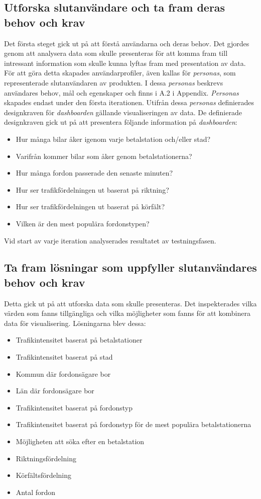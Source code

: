 \documentclass[12pt]{kththesis}
\begin{document}
\subsection{Utforska slutanvändare och ta fram deras behov och krav}
Det första steget gick ut på att förstå användarna och deras behov. Det gjordes genom att analysera data som skulle presenteras för att komma fram till intressant information som skulle kunna lyftas fram med presentation av data. För att göra detta skapades användarprofiler, även kallas för \textit{personas}, som representerade slutanvändaren av produkten. I dessa \textit{personas} beskrevs användares behov, mål och egenskaper och finns i A.2 i Appendix. \textit{Personas} skapades endast under den första iterationen. Utifrån dessa \textit{personas} definierades designkraven för \textit{dashboarden} gällande visualiseringen av data. De definierade designkraven gick ut på att presentera följande information på \textit{dashboarden}:

\begin{itemize}
\item Hur många bilar åker igenom varje betalstation och/eller stad?
\item Varifrån kommer bilar som åker genom betalstationerna? 
\item Hur många fordon passerade den senaste minuten? 
\item Hur ser trafikfördelningen ut baserat på riktning? 
\item Hur ser trafikfördelningen ut baserat på körfält? 
\item Vilken är den mest populära fordonstypen?
\end{itemize}

Vid start av varje iteration analyserades resultatet av testningsfasen. 

\subsection{Ta fram lösningar som uppfyller slutanvändares behov och krav}
Detta gick ut på att utforska data som skulle presenteras. Det inspekterades vilka värden som fanns tillgängliga och vilka möjligheter som fanns för att kombinera data för visualisering. Lösningarna blev dessa:
 
\begin{itemize}
\item Trafikintensitet baserat på betalstationer
\item Trafikintensitet baserat på stad
\item Kommun där fordonsägare bor
\item Län där fordonsägare bor
\item Trafikintensitet baserat på fordonstyp 
\item Trafikintensitet baserat på fordonstyp för de mest populära betalstationerna
\item Möjligheten att söka efter en betalstation
\item Riktningsfördelning
\item Körfältsfördelning
\item Antal fordon
\end{itemize}
\end{document}
